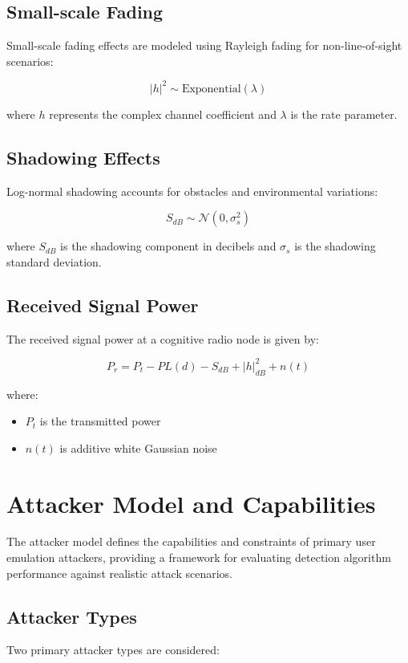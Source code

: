 \subsection{Small-scale Fading}
Small-scale fading effects are modeled using Rayleigh fading for non-line-of-sight scenarios:

\begin{equation}
|h|^2 \sim \text{Exponential}(\lambda)
\end{equation}

where $h$ represents the complex channel coefficient and $\lambda$ is the rate parameter.

\subsection{Shadowing Effects}
Log-normal shadowing accounts for obstacles and environmental variations:

\begin{equation}
S_{dB} \sim \mathcal{N}(0, \sigma_s^2)
\end{equation}

where $S_{dB}$ is the shadowing component in decibels and $\sigma_s$ is the shadowing standard deviation.

\subsection{Received Signal Power}
The received signal power at a cognitive radio node is given by:

\begin{equation}
P_r = P_t - PL(d) - S_{dB} + |h|^2_{dB} + n(t)
\end{equation}

where:
\begin{itemize}
\item $P_t$ is the transmitted power
\item $n(t)$ is additive white Gaussian noise
\end{itemize}

\section{Attacker Model and Capabilities}
The attacker model defines the capabilities and constraints of primary user emulation attackers, providing a framework for evaluating detection algorithm performance against realistic attack scenarios.

\subsection{Attacker Types}
Two primary attacker types are considered:

